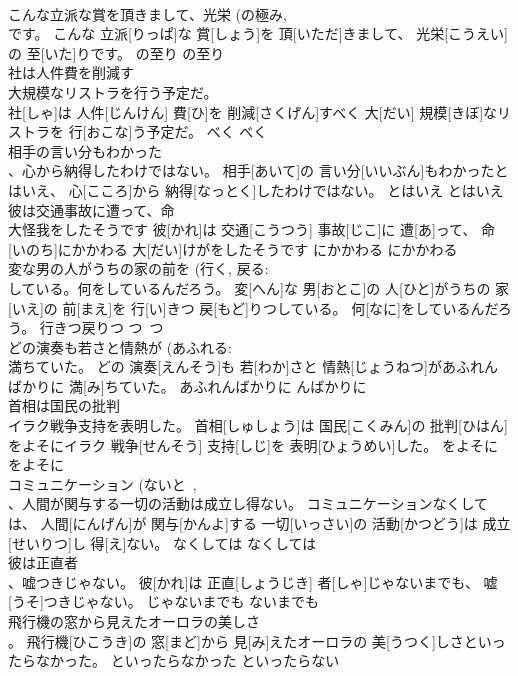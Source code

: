 \documentclass[8pt]{extreport}
\begin{document}
\begin{CJK}{UTF8}{min}
\\	こんな立派な賞を頂きまして、光栄 (の極み, 
\\	です。	こんな 立派[りっぱ]な 賞[しょう]を 頂[いただ]きまして、 光栄[こうえい]の 至[いた]りです。	の至り	の至り	
\\	社は人件費を削減す 
\\	大規模なリストラを行う予定だ。	
\\	社[しゃ]は 人件[じんけん] 費[ひ]を 削減[さくげん]すべく 大[だい] 規模[きぼ]なリストラを 行[おこな]う予定だ。	べく	べく	
\\	相手の言い分もわかった 
\\	、心から納得したわけではない。	相手[あいて]の 言い分[いいぶん]もわかったとはいえ、 心[こころ]から 納得[なっとく]したわけではない。	とはいえ	とはいえ	
\\	彼は交通事故に遭って、命 
\\	大怪我をしたそうです	彼[かれ]は 交通[こうつう] 事故[じこ]に 遭[あ]って、 命[いのち]にかかわる 大[だい]けがをしたそうです	にかかわる	にかかわる	
\\	変な男の人がうちの家の前を (行く, 戻る: 
\\	している。何をしているんだろう。	変[へん]な 男[おとこ]の 人[ひと]がうちの 家[いえ]の 前[まえ]を 行[い]きつ 戻[もど]りつしている。 何[なに]をしているんだろう。	行きつ戻りつ	つ~つ	
\\	どの演奏も若さと情熱が (あふれる: 
\\	満ちていた。	どの 演奏[えんそう]も 若[わか]さと 情熱[じょうねつ]があふれんばかりに 満[み]ちていた。	あふれんばかりに	んばかりに	
\\	首相は国民の批判 
\\	イラク戦争支持を表明した。	首相[しゅしょう]は 国民[こくみん]の 批判[ひはん]をよそにイラク 戦争[せんそう] 支持[しじ]を 表明[ひょうめい]した。	をよそに	をよそに	
\\	コミュニケーション (ないと~, 
\\	、人間が関与する一切の活動は成立し得ない。	コミュニケーションなくしては、 人間[にんげん]が 関与[かんよ]する 一切[いっさい]の 活動[かつどう]は 成立[せいりつ]し 得[え]ない。	なくしては	なくしては	
\\	彼は正直者 
\\	、嘘つきじゃない。	彼[かれ]は 正直[しょうじき] 者[しゃ]じゃないまでも、 嘘[うそ]つきじゃない。	じゃないまでも	ないまでも	
\\	飛行機の窓から見えたオーロラの美しさ 
\\	。	飛行機[ひこうき]の 窓[まど]から 見[み]えたオーロラの 美[うつく]しさといったらなかった。	といったらなかった	といったらない	

\end{CJK}
\end{document}
